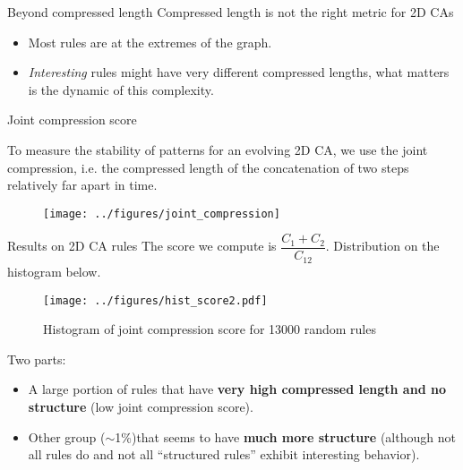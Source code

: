 \documentclass[xcolor=dvipsnames]{beamer}
\begin{document}
\begin{frame}{Beyond compressed length}
  Compressed length is not the right metric for 2D CAs
  \begin{itemize}
    \item Most rules are at the extremes of the graph.
    \item \emph{Interesting} rules might have very different compressed lengths,
      what matters is the \alert{dynamic} of this complexity.
  \end{itemize}

\end{frame}


\begin{frame}{Joint compression score}

  To measure the \alert{stability} of patterns for an evolving 2D CA, we use the
  joint compression, i.e. the compressed length of the concatenation of two
  steps relatively far apart in time.

  \begin{figure}[htbp]
    \centering
    \texttt{[image: ../figures/joint\_compression]}
    \label{fig:joint_comp}
  \end{figure}

\end{frame}

\begin{frame}{Results on 2D CA rules}
  The score we compute is $\dfrac{C_1 + C_2}{C_{12}}$. Distribution on the
  histogram below.

  \begin{minipage}[h]{.49\linewidth}
    \begin{figure}[htbp]
      \centering
      \texttt{[image: ../figures/hist\_score2.pdf]}
      \caption{Histogram of joint compression score for 13000 random rules}
      \label{fig:joint_hist}
    \end{figure}
  \end{minipage}
  \begin{minipage}[h]{.49\linewidth}
    Two parts:
    \begin{itemize}
    \item A large portion of rules that have \textbf{very high compressed length
        and no structure} (low joint compression score).
    \item Other group ($\sim$1\%)that seems to have \textbf{much more structure}
      (although not all rules do and not all ``structured rules'' exhibit
      interesting behavior).
    \end{itemize}
  \end{minipage}

\end{frame}
\end{document}
